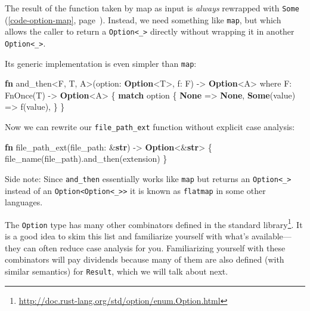 \documentclass[a4paper,]{book}
\renewcommand*{\hyperref}[2][\ar]{%
  \def\ar{#2}%
  #2 (\autoref{#1}, page~\pageref{#1})}
\newenvironment{Shaded}{\begin{snugshade}}{\end{snugshade}}
\newcommand{\KeywordTok}[1]{\textcolor[rgb]{0.13,0.29,0.53}{\textbf{{#1}}}}
\newcommand{\NormalTok}[1]{{#1}}
\renewcommand{\href}[2]{#2\footnote{\url{#1}}}
\begin{document}
The result of the function taken by map as input is \emph{always}
\hyperref[code-option-map]{rewrapped with \texttt{Some}}. Instead, we
need something like \texttt{map}, but which allows the caller to return
a \texttt{Option\textless{}\_\textgreater{}} directly without wrapping
it in another \texttt{Option\textless{}\_\textgreater{}}.

Its generic implementation is even simpler than \texttt{map}:

\begin{Shaded}
\begin{Highlighting}[]
\KeywordTok{fn} \NormalTok{and_then<F, T, A>(option: }\KeywordTok{Option}\NormalTok{<T>, f: F) -> }\KeywordTok{Option}\NormalTok{<A>}
        \NormalTok{where F: FnOnce(T) -> }\KeywordTok{Option}\NormalTok{<A> \{}
    \KeywordTok{match} \NormalTok{option \{}
        \KeywordTok{None} \NormalTok{=> }\KeywordTok{None}\NormalTok{,}
        \KeywordTok{Some}\NormalTok{(value) => f(value),}
    \NormalTok{\}}
\NormalTok{\}}
\end{Highlighting}
\end{Shaded}

Now we can rewrite our \texttt{file\_path\_ext} function without
explicit case analysis:

\begin{Shaded}
\begin{Highlighting}[]
\KeywordTok{fn} \NormalTok{file_path_ext(file_path: &}\KeywordTok{str}\NormalTok{) -> }\KeywordTok{Option}\NormalTok{<&}\KeywordTok{str}\NormalTok{> \{}
    \NormalTok{file_name(file_path).and_then(extension)}
\NormalTok{\}}
\end{Highlighting}
\end{Shaded}

Side note: Since \texttt{and\_then} essentially works like \texttt{map}
but returns an \texttt{Option\textless{}\_\textgreater{}} instead of an
\texttt{Option\textless{}Option\textless{}\_\textgreater{}\textgreater{}}
it is known as \texttt{flatmap} in some other languages.

The \texttt{Option} type has many other combinators
\href{http://doc.rust-lang.org/std/option/enum.Option.html}{defined in
the standard library}. It is a good idea to skim this list and
familiarize yourself with what's available---they can often reduce case
analysis for you. Familiarizing yourself with these combinators will pay
dividends because many of them are also defined (with similar semantics)
for \texttt{Result}, which we will talk about next.
\end{document}
